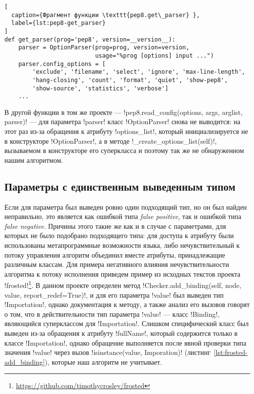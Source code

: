 \begin{lstlisting}[
  caption={Фрагмент функции \texttt{pep8.get\_parser} }, 
  label={lst:pep8-get_parser} 
]
def get_parser(prog='pep8', version=__version__):
    parser = OptionParser(prog=prog, version=version,
                          usage="%prog [options] input ...")
    parser.config_options = [
        'exclude', 'filename', 'select', 'ignore', 'max-line-length',
        'hang-closing', 'count', 'format', 'quiet', 'show-pep8',
        'show-source', 'statistics', 'verbose']
    ...
\end{lstlisting}

В другой функции в том же проекте --- 
!pep8.read_config(options, args, arglist, parser)!
--- для параметра !parser!
класс !OptionParser! снова не выводится: на этот раз из-за обращения к атрибуту
!options_list!, который инициализируется не в конструкторе !OptionParser!, а в
методе !_create_options_list(self)!, вызываемом в конструкторе его суперкласса и
поэтому так же не обнаруженном нашим алгоритмом.

\subsection{Параметры с единственным выведенным типом}
\label{sub:single-type-parameters}

Если для параметра был выведен ровно один подходящий тип, но он был найден
неправильно, это является как ошибкой типа \emph{false positive}, так и ошибкой типа
\emph{false negative}. Причины этого такие же как и в случае с параметрами, для
которых не было подобрано подходящего типа: для доступа к атрибуту были
использованы метапрограммные возможности языка, либо нечувствительный к потоку
управления алгоритм объединил вместе атрибуты, принадлежащие различным классам.
Для примера негативного влияния нечувствительности алгоритма к потоку исполнения
приведем пример из исходных текстов проекта
!frosted!\footnote{\url{https://github.com/timothycrosley/frosted}}. В данном
проекте определен метод !Checker.add_binding(self, node, value, report_redef=True)!, 
и для его параметра !value! был выведен тип !Importation!, однако документация к
методу, а также анализ его вызовов говорят о том, что в действительности тип
параметра !value! --- класс !Binding!, являющийся суперклассом для
!Importation!. Слишком специфический класс был выведен из-за обращения к
атрибуту !fullName!, который содержится только в классе !Importation!, однако
обращение выполняется после явной проверки типа значения !value! через вызов
!isinstance(value, Imporation)! (листинг~\ref{lst:frosted-add_binding}), которые
наш алгоритм не учитывает. 

